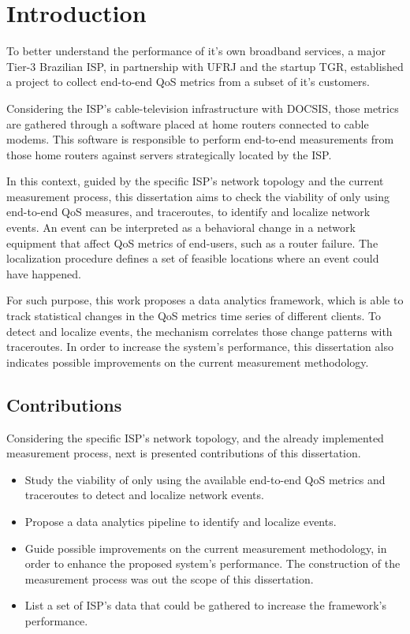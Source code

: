 \chapter{Introduction}

To better understand the performance of it's own broadband services, a major
Tier-3 Brazilian ISP, in partnership with UFRJ and the startup TGR,
established a project to collect end-to-end QoS metrics from a subset
of it's customers.

Considering the ISP's cable-television infrastructure with DOCSIS,
those metrics are gathered through a software placed at home routers connected
to cable modems. This software is responsible to perform end-to-end
measurements from those home routers against servers strategically
located by the ISP\@.

In this context, guided by the specific ISP's network topology
and the current measurement process,
this dissertation aims to check the viability of
only using end-to-end QoS measures, and traceroutes,
to identify and localize network events. An event can be interpreted as a
behavioral change in a network equipment that affect QoS metrics of end-users,
such as a router failure. The localization procedure defines a set of
feasible locations where an event could have happened.

For such purpose, this work proposes a data analytics framework, which is able
to track statistical changes in the QoS metrics time series of different
clients.
To detect and localize events, the mechanism correlates those change
patterns with traceroutes.
In order to increase the system's performance,
this dissertation also indicates possible improvements on the current
measurement methodology.

\section{Contributions}

Considering the specific ISP's network topology, and the already implemented
measurement process, next is presented contributions of this dissertation.

\begin{itemize}
\item
Study the viability of only using the available end-to-end QoS metrics and
traceroutes to detect and localize network events.

\item Propose a data analytics pipeline to identify and localize events.

\item Guide possible improvements on the current measurement methodology,
in order to enhance the proposed system's performance. The construction
of the measurement process was out the scope of this dissertation.

\item List a set of ISP's data that could be gathered to increase the
framework's performance.

\end{itemize}


